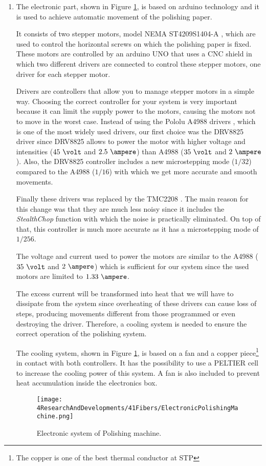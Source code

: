 \begin{enumerate}
\item{} The electronic part, shown in Figure \ref{fig:ElectronicSystemPolishingMachine}, is based on arduino technology and it is used to achieve automatic movement of the polishing paper.

It consists of two stepper motors, model NEMA ST4209S1404-A \cite{StepperMotors}, which are used to control the horizontal screws on which the polishing paper is fixed. These motors are controlled by an arduino UNO \cite{ArduinoUNO} that uses a CNC shield \cite{CNCShield} in which two different drivers are connected to control these stepper motors, one driver for each stepper motor.

Drivers are controllers that allow you to manage stepper motors in a simple way. Choosing the correct controller for your system is very important because it can limit the supply power to the motors, causing the motors not to move in the worst case. Instead of using the Pololu A4988 drivers \cite{A4988Driver}, which is one of the most widely used drivers, our first choice was the DRV8825 driver \cite{DRV8825Driver} since DRV8825 allows to power the motor with higher voltage and intensities ($45~\volt$ and $2.5~\ampere$) than A4988 ($35~\volt$ and $2~\ampere$). Also, the DRV8825 controller includes a new microstepping mode ($1/32$) compared to the A4988 ($1/16$) with which we get more accurate and smooth movements.

Finally these drivers was replaced by the TMC2208 \cite{TMC2208Driver}. The main reason for this change was that they are much less noisy since it includes the \textit{StealthChop} function with which the noise is practically eliminated. On top of that, this controller is much more accurate as it has a microstepping mode of $1/256$.

The voltage and current used to power the motors are similar to the A4988 ($35~\volt$ and $2~\ampere$) which is sufficient for our system since the used motors are limited to $1.33~\ampere$. 

The excess current will be transformed into heat that we will have to dissipate from the system since overheating of these drivers can cause loss of steps, producing movements different from those programmed or even destroying the driver. Therefore, a cooling system is needed to ensure the correct operation of the polishing system.

The cooling system, shown in Figure \ref{fig:ElectronicSystemPolishingMachine}, is based on a fan and a copper piece\footnote{The copper is one of the best thermal conductor at STP} in contact with both controllers. It has the possibility to use a PELTIER cell to increase the cooling power of this system. A fan is also included to prevent heat accumulation inside the electronics box.

\begin{figure}[h]
\centering
\texttt{[image: 4ResearchAndDevelopments/41Fibers/ElectronicPolishingMachine.png]}
\caption{Electronic system of Polishing machine.\label{fig:ElectronicSystemPolishingMachine}}
\end{figure}

\end{enumerate}

